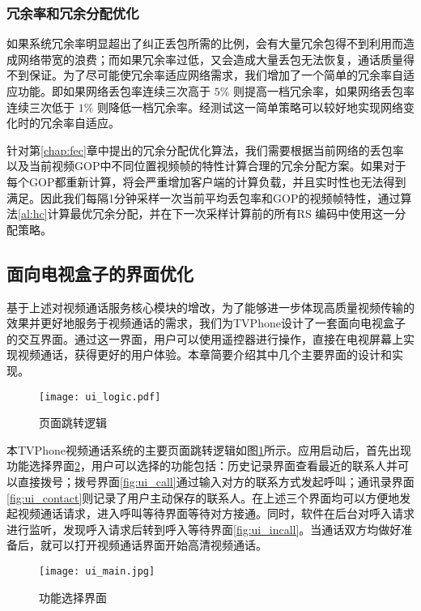     \subsubsection{冗余率和冗余分配优化}
    如果系统冗余率明显超出了纠正丢包所需的比例，会有大量冗余包得不到利用而造成网络带宽的浪费；而如果冗余率过低，又会造成大量丢包无法恢复，通话质量得不到保证。为了尽可能使冗余率适应网络需求，我们增加了一个简单的冗余率自适应功能。即如果网络丢包率连续三次高于 $5\%$ 则提高一档冗余率，如果网络丢包率连续三次低于 $1\%$ 则降低一档冗余率。经测试这一简单策略可以较好地实现网络变化时的冗余率自适应。

    针对第\ref{chap:fec}章中提出的冗余分配优化算法，我们需要根据当前网络的丢包率以及当前视频GOP中不同位置视频帧的特性计算合理的冗余分配方案。如果对于每个GOP都重新计算，将会严重增加客户端的计算负载，并且实时性也无法得到满足。因此我们每隔1分钟采样一次当前平均丢包率和GOP的视频帧特性，通过算法\ref{al:hc}计算最优冗余分配，并在下一次采样计算前的所有RS 编码中使用这一分配策略。


\subsection{面向电视盒子的界面优化}
基于上述对视频通话服务核心模块的增改，为了能够进一步体现高质量视频传输的效果并更好地服务于视频通话的需求，我们为TVPhone设计了一套面向电视盒子的交互界面。通过这一界面，用户可以使用遥控器进行操作，直接在电视屏幕上实现视频通话，获得更好的用户体验。本章简要介绍其中几个主要界面的设计和实现。

\begin{figure}[htbp]
  \centering
  \texttt{[image: ui\_logic.pdf]}
  \caption{页面跳转逻辑}
  \label{fig:ui_logic}
\end{figure}

本TVPhone视频通话系统的主要页面跳转逻辑如图\ref{fig:ui_logic}所示。应用启动后，首先出现功能选择界面\ref{fig:ui_main}，用户可以选择的功能包括：历史记录界面查看最近的联系人并可以直接拨号；拨号界面\ref{fig:ui_call}通过输入对方的联系方式发起呼叫；通讯录界面\ref{fig:ui_contact}则记录了用户主动保存的联系人。在上述三个界面均可以方便地发起视频通话请求，进入呼叫等待界面等待对方接通。同时，软件在后台对呼入请求进行监听，发现呼入请求后转到呼入等待界面\ref{fig:ui_incall}。当通话双方均做好准备后，就可以打开视频通话界面开始高清视频通话。

\begin{figure}[htbp]
  \centering
  \texttt{[image: ui\_main.jpg]}
  \caption{功能选择界面}
  \label{fig:ui_main}
\end{figure}

